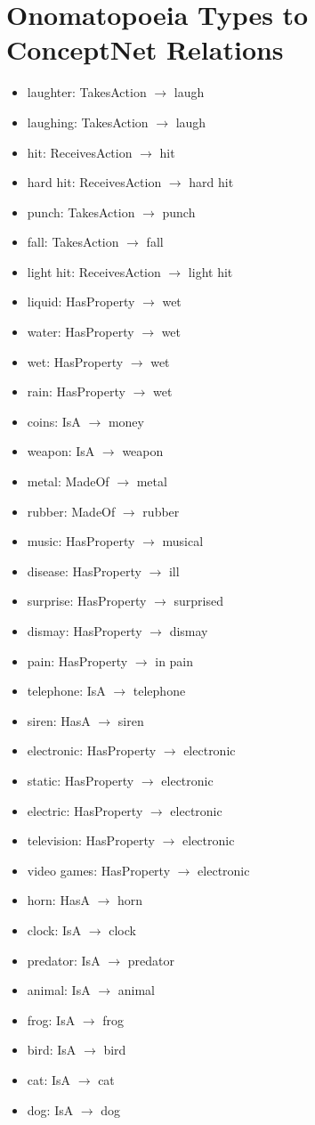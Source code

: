 \section{Onomatopoeia Types to ConceptNet Relations}
\label{sec:ono-relation}
\begin{itemize}
\item{laughter: TakesAction $\rightarrow$ laugh}
\item{laughing: TakesAction $\rightarrow$ laugh}
\item{hit: ReceivesAction $\rightarrow$ hit}
\item{hard hit: ReceivesAction $\rightarrow$ hard hit}
\item{punch: TakesAction $\rightarrow$ punch}
\item{fall: TakesAction $\rightarrow$ fall}
\item{light hit: ReceivesAction $\rightarrow$ light hit}
\item{liquid: HasProperty $\rightarrow$ wet}
\item{water: HasProperty $\rightarrow$ wet}
\item{wet: HasProperty $\rightarrow$ wet}
\item{rain: HasProperty $\rightarrow$ wet}
\item{coins: IsA $\rightarrow$ money}
\item{weapon: IsA $\rightarrow$ weapon}
\item{metal: MadeOf $\rightarrow$ metal}
\item{rubber: MadeOf $\rightarrow$ rubber}
\item{music: HasProperty $\rightarrow$ musical}
\item{disease: HasProperty $\rightarrow$ ill}
\item{surprise: HasProperty $\rightarrow$ surprised}
\item{dismay: HasProperty $\rightarrow$ dismay}
\item{pain: HasProperty $\rightarrow$ in pain}
\item{telephone: IsA $\rightarrow$ telephone}
\item{siren: HasA $\rightarrow$ siren}
\item{electronic: HasProperty $\rightarrow$ electronic}
\item{static: HasProperty $\rightarrow$ electronic}
\item{electric: HasProperty $\rightarrow$ electronic}
\item{television: HasProperty $\rightarrow$ electronic}
\item{video games: HasProperty $\rightarrow$ electronic}
\item{horn: HasA $\rightarrow$ horn}
\item{clock: IsA $\rightarrow$ clock}
\item{predator: IsA $\rightarrow$ predator}
\item{animal: IsA $\rightarrow$ animal}
\item{frog: IsA $\rightarrow$ frog}
\item{bird: IsA $\rightarrow$ bird}
\item{cat: IsA $\rightarrow$ cat}
\item{dog: IsA $\rightarrow$ dog}
\end{itemize}

